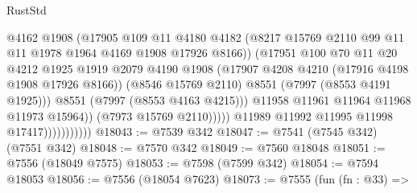 \begin{lexlean}{RustStd}
\begin{coremodule}
{\begin{coremodule}
{{{{{{{{{{{{{{{{{{{{{{{{{{{{{{{{{{{{{{{{{{{                                        @4162
                                        @1908
                                        (@17905
                                          @109
                                          @11
                                          @4180
                                          @4182
                                          (@8217
                                            @15769
                                            @2110
                                            @99
                                            @11
                                            @11
                                            @1978
                                            @1964
                                            @4169
                                            @1908
                                            @17926
                                            @8166))
                                        (@17951
                                          @100
                                          @70
                                          @11
                                          @20
                                          @4212
                                          @1925
                                          @1919
                                          @2079
                                          @4190
                                          @1908
                                          (@17907 @4208 @4210 (@17916 @4198 @1908 @17926 @8166))
                                          (@8546 @15769 @2110)
                                          @8551
                                          (@7997 (@8553 @4191 @1925)))
                                        @8551
                                        (@7997 (@8553 @4163 @4215)))
                                      @11958
                                      @11961
                                      @11964
                                      @11968
                                      @11973
                                      @15964))
                                  (@7973 @15769 @2110)))))
                          @11989
                          @11992
                          @11995
                          @11998
                          @17417)))))))))))
@18043 := @7539 @342
@18047 := @7541 (@7545 @342) (@7551 @342)
@18048 := @7570 @342
@18049 := @7560 @18048
@18051 := @7556 (@18049 @7575)
@18053 := @7598 (@7599 @342)
@18054 := @7594 @18053
@18056 := @7556 (@18054 @7623)
@18073 := @7555
    (fun (fn : @33) =>
}}}}}}}}}}}}}}}}}}}}}}}}}}}}}}}}}}}}}}}}}}}
\end{coremodule}}
\end{coremodule}
\end{lexlean}
